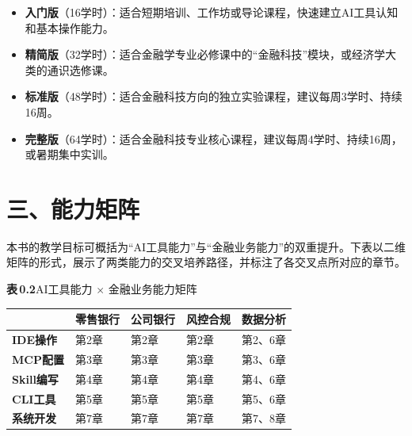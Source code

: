 \begin{notebox}[选课建议]
\begin{itemize}[leftmargin=1.5em]
  \item \textbf{入门版}（16学时）：适合短期培训、工作坊或导论课程，快速建立AI工具认知和基本操作能力。
  \item \textbf{精简版}（32学时）：适合金融学专业必修课中的``金融科技''模块，或经济学大类的通识选修课。
  \item \textbf{标准版}（48学时）：适合金融科技方向的独立实验课程，建议每周3学时、持续16周。
  \item \textbf{完整版}（64学时）：适合金融科技专业核心课程，建议每周4学时、持续16周，或暑期集中实训。
\end{itemize}
\end{notebox}

\vspace{2em}


\section*{三、能力矩阵}

本书的教学目标可概括为``AI工具能力''与``金融业务能力''的双重提升。下表以二维矩阵的形式，展示了两类能力的交叉培养路径，并标注了各交叉点所对应的章节。

\vspace{1em}

\noindent\textbf{表\,0.2}\quad AI工具能力 $\times$ 金融业务能力矩阵

\vspace{0.5em}

\begin{tabularx}{\textwidth}{l >{\centering}X >{\centering}X >{\centering}X >{\centering\arraybackslash}X}
\toprule
 & \textbf{零售银行} & \textbf{公司银行} & \textbf{风控合规} & \textbf{数据分析} \\
\midrule
\textbf{IDE操作} & 第2章 & 第2章 & 第2章 & 第2、6章 \\[0.8em]

\textbf{MCP配置} & 第3章 & 第3章 & 第3章 & 第3、6章 \\[0.8em]

\textbf{Skill编写} & 第4章 & 第4章 & 第4章 & 第4、6章 \\[0.8em]

\textbf{CLI工具} & 第5章 & 第5章 & 第5章 & 第5、6章 \\[0.8em]

\textbf{系统开发} & 第7章 & 第7章 & 第7章 & 第7、8章 \\
\bottomrule
\end{tabularx}

